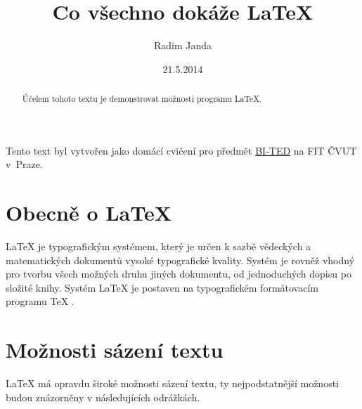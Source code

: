 \documentclass[a4paper,11pt]{article}
\title{Co všechno dokáže \LaTeX}
\author{Radim Janda}
\date{21.5.2014}
\begin{document}
\maketitle

\begin{abstract}
	Účelem tohoto textu je demonstrovat možnosti programu \LaTeX{}.
\end{abstract}

Tento text byl vytvořen jako domácí cvičení pro předmět \href{http://edux.fit.cvut.cz/courses/BI-TED/}{BI-TED} na FIT ČVUT v~Praze.

\section{Obecně o \LaTeX}
LaTeX je typografickým systémem, který je určen k sazbě vědeckých a matematických dokumentů vysoké typografické kvality. Systém je rovněž vhodný pro tvorbu všech možných druhu jiných dokumentu, od jednoduchých dopisu po složité knihy. Systém LaTeX je postaven na typografickém formátovacím programu TeX \cite{LaTeX}.

\section{Možnosti sázení textu}
LaTeX má opravdu široké možnosti sázení textu, ty nejpodstatnější možnosti budou znázorněny v následujících odrážkách.
\end{document}
